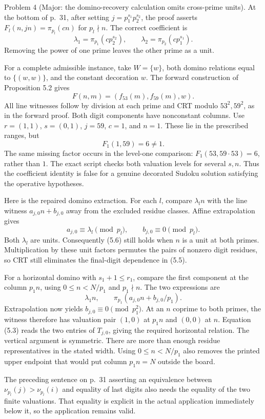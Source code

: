 \documentclass[10pt]{article}
\begin{document}
Problem 4 (Major: the domino-recovery calculation omits cross-prime units).  At the bottom of p. 31, after setting \(j=p_1^{s_1}p_2^{s_2}\), the proof asserts \(F_l(n,jn)=\pi_{p_l}(cn)\) for \(p_l\nmid n\). The correct coefficient is \[\lambda_1=\pi_{p_1}(c p_2^{s_2}),\qquad
 \lambda_2=\pi_{p_2}(c p_1^{s_1}).\] Removing the power of one prime leaves the other prime as a unit.\par
For a complete admissible instance, take \(W=\{w\}\), both domino relations equal to \(\{(w,w)\}\), and the constant decoration \(w\). The forward construction of Proposition 5.2 gives \[F(n,m)=(f_{53}(m),f_{59}(m),w).\] All line witnesses follow by division at each prime and CRT modulo \(53^2,59^2\), as in the forward proof. Both digit components have nonconstant columns. Use \(r=(1,1)\), \(s=(0,1)\), \(j=59\), \(c=1\), and \(n=1\). These lie in the prescribed ranges, but \[F_1(1,59)=6\ne1.\] The same missing factor occurs in the level-one comparison: \(F_1(53,59\cdot53)=6\), rather than \(1\). The exact script checks both valuation levels for several \(s,n\). Thus the coefficient identity is false for a genuine decorated Sudoku solution satisfying the operative hypotheses.\par
Here is the repaired domino extraction. For each \(l\), compare \(\lambda_l n\) with the line witness \(a_{j,0}n+b_{j,0}\) away from the excluded residue classes. Affine extrapolation gives \[a_{j,0}\equiv\lambda_l\pmod {p_l},\qquad
 b_{j,0}\equiv0\pmod {p_l}.\] Both \(\lambda_l\) are units. Consequently (5.6) still holds when \(n\) is a unit at both primes. Multiplication by these unit factors permutes the pairs of nonzero digit residues, so CRT still eliminates the final-digit dependence in (5.5).\par
For a horizontal domino with \(s_1+1\le r_1\), compare the first component at the column \(p_1n\), using \(0\le n<N/p_1\) and \(p_1\nmid n\). The two expressions are \[\lambda_1 n,\qquad
 \pi_{p_1}\!\left(a_{j,0}n+b_{j,0}/p_1\right).\] Extrapolation now yields \(b_{j,0}\equiv0\pmod {p_1^2}\). At an \(n\) coprime to both primes, the witness therefore has valuation pair \((1,0)\) at \(p_1n\) and \((0,0)\) at \(n\). Equation (5.3) reads the two entries of \(T_{j,0}\), giving the required horizontal relation. The vertical argument is symmetric. There are more than enough residue representatives in the stated width. Using \(0\le n<N/p_1\) also removes the printed upper endpoint that would put column \(p_1n=N\) outside the board.\par
The preceding sentence on p. 31 asserting an equivalence between \(\nu_{p_l}(j)>\nu_{p_l}(i)\) and equality of last digits also needs the equality of the two finite valuations. That equality is explicit in the actual application immediately below it, so the application remains valid.\par
\end{document}
